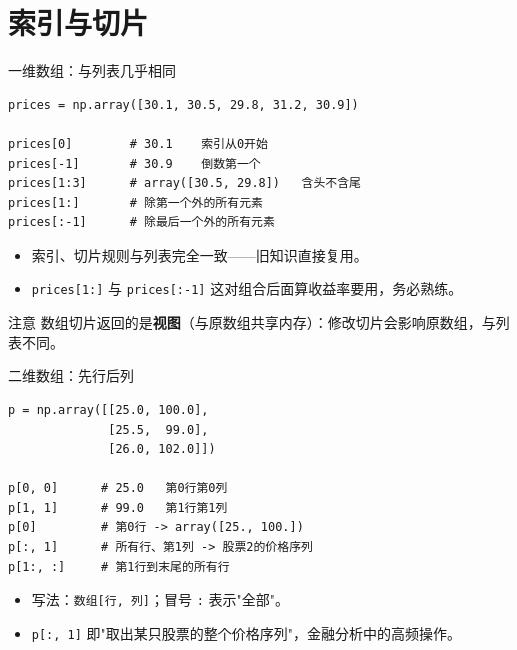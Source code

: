 \documentclass[9pt]{ctexbeamer}
\begin{document}
\section{索引与切片}

\begin{frame}[fragile]{一维数组：与列表几乎相同}
	\begin{lstlisting}
prices = np.array([30.1, 30.5, 29.8, 31.2, 30.9])

prices[0]        # 30.1    索引从0开始
prices[-1]       # 30.9    倒数第一个
prices[1:3]      # array([30.5, 29.8])   含头不含尾
prices[1:]       # 除第一个外的所有元素
prices[:-1]      # 除最后一个外的所有元素
\end{lstlisting}
	\begin{itemize}
		\item 索引、切片规则与列表完全一致——旧知识直接复用。
		\item \texttt{prices[1:]} 与 \texttt{prices[:-1]} 这对组合后面算收益率要用，务必熟练。
	\end{itemize}
	\begin{alertblock}{注意}
		数组切片返回的是\textbf{视图}（与原数组共享内存）：修改切片会影响原数组，与列表不同。
	\end{alertblock}
\end{frame}

\begin{frame}[fragile]{二维数组：先行后列}
	\begin{lstlisting}
p = np.array([[25.0, 100.0],
              [25.5,  99.0],
              [26.0, 102.0]])

p[0, 0]      # 25.0   第0行第0列
p[1, 1]      # 99.0   第1行第1列
p[0]         # 第0行 -> array([25., 100.])
p[:, 1]      # 所有行、第1列 -> 股票2的价格序列
p[1:, :]     # 第1行到末尾的所有行
\end{lstlisting}
	\begin{itemize}
		\item 写法：\texttt{数组[行, 列]}；冒号 \texttt{:} 表示"全部"。
		\item \texttt{p[:, 1]} 即"取出某只股票的整个价格序列"，金融分析中的高频操作。
	\end{itemize}
\end{frame}
\end{document}
